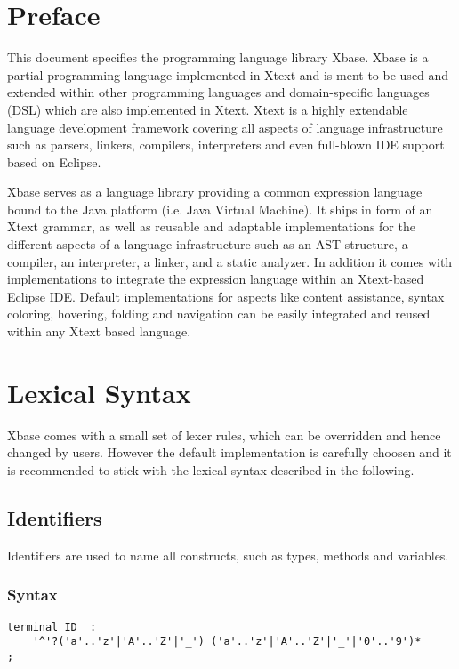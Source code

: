 \documentclass[a4paper,10pt]{scrreprt}
\begin{document}
\chapter{Preface\label{Preface}}
This document specifies the programming language library Xbase. Xbase is a partial programming language implemented in Xtext and is ment to be used and extended
 within other programming languages and domain-specific languages (DSL) which are also implemented in Xtext. Xtext is a highly extendable language development framework 
covering all aspects of language infrastructure such as parsers, linkers, compilers, interpreters and even full-blown IDE support based on Eclipse. 

Xbase serves as a language library providing a common expression language bound to the Java platform (i.e. Java Virtual Machine). It ships in form of an Xtext grammar, as well as 
reusable and adaptable implementations for the different aspects of a language infrastructure such as an AST structure, a compiler, an interpreter, a linker,  and  a static analyzer.
In addition it comes with implementations to integrate the expression language within an Xtext-based Eclipse IDE. Default implementations for aspects like content assistance, syntax coloring, 
hovering, folding and navigation can be easily integrated and reused within any Xtext based language. 



\chapter{Lexical Syntax}
Xbase comes with a small set of lexer rules, which can be overridden and hence changed by users. However the default implementation is carefully choosen and it is recommended to stick 
with the lexical syntax described in the following.

\section{Identifiers\label{Identifiers}}
Identifiers are used to name all constructs, such as types, methods and variables.

\subsection{Syntax}
\begin{lstlisting}
terminal ID  : 
	'^'?('a'..'z'|'A'..'Z'|'_') ('a'..'z'|'A'..'Z'|'_'|'0'..'9')*
;

\end{lstlisting}
\end{document}
